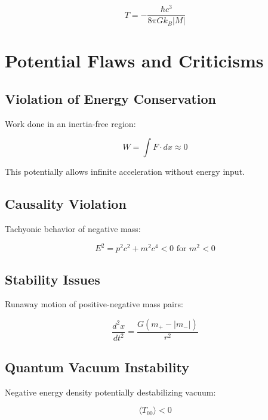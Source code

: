 \documentclass{article}
\begin{document}
\begin{equation}
    T = -\frac{\hbar c^3}{8\pi G k_B |M|}
\end{equation}

\section{Potential Flaws and Criticisms}

\subsection{Violation of Energy Conservation}

Work done in an inertia-free region:

\begin{equation}
    W = \int F \cdot dx \approx 0
\end{equation}

This potentially allows infinite acceleration without energy input.

\subsection{Causality Violation}

Tachyonic behavior of negative mass:

\begin{equation}
    E^2 = p^2c^2 + m^2c^4 < 0 \text{ for } m^2 < 0
\end{equation}

\subsection{Stability Issues}

Runaway motion of positive-negative mass pairs:

\begin{equation}
    \frac{d^2x}{dt^2} = \frac{G(m_+ - |m_-|)}{r^2}
\end{equation}

\subsection{Quantum Vacuum Instability}

Negative energy density potentially destabilizing vacuum:

\begin{equation}
    \langle T_{00} \rangle < 0
\end{equation}
\end{document}
